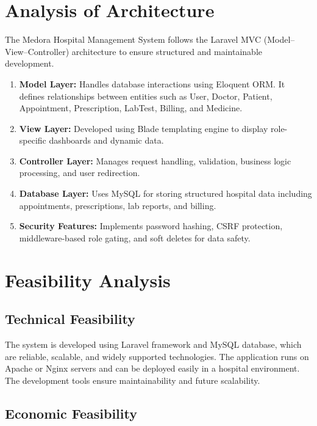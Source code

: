 \section{Analysis of Architecture}

The Medora Hospital Management System follows the Laravel MVC (Model–View–Controller) architecture to ensure structured and maintainable development.

\begin{enumerate}

\item \textbf{Model Layer:}
Handles database interactions using Eloquent ORM. It defines relationships between entities such as User, Doctor, Patient, Appointment, Prescription, LabTest, Billing, and Medicine.

\item \textbf{View Layer:}
Developed using Blade templating engine to display role-specific dashboards and dynamic data.

\item \textbf{Controller Layer:}
Manages request handling, validation, business logic processing, and user redirection.

\item \textbf{Database Layer:}
Uses MySQL for storing structured hospital data including appointments, prescriptions, lab reports, and billing.

\item \textbf{Security Features:}
Implements password hashing, CSRF protection, middleware-based role gating, and soft deletes for data safety.

\end{enumerate}

\section{Feasibility Analysis}

\subsection{Technical Feasibility}

The system is developed using Laravel framework and MySQL database, which are reliable, scalable, and widely supported technologies. The application runs on Apache or Nginx servers and can be deployed easily in a hospital environment. The development tools ensure maintainability and future scalability.

\subsection{Economic Feasibility}

